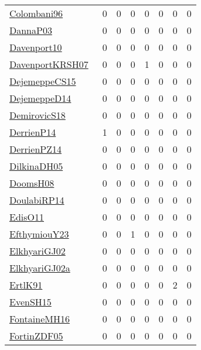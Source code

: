 {\begin{longtable}{l*{7}{r}}
\href{papers/Colombani96.pdf}{Colombani96}~\cite{Colombani96} & 0 & 0 & 0 & 0 & 0 & 0 & 0\\
\href{papers/DannaP03.pdf}{DannaP03}~\cite{DannaP03} & 0 & 0 & 0 & 0 & 0 & 0 & 0\\
\href{papers/Davenport10.pdf}{Davenport10}~\cite{Davenport10} & 0 & 0 & 0 & 0 & 0 & 0 & 0\\
\href{papers/DavenportKRSH07.pdf}{DavenportKRSH07}~\cite{DavenportKRSH07} & 0 & 0 & 0 & 1 & 0 & 0 & 0\\
\href{papers/DejemeppeCS15.pdf}{DejemeppeCS15}~\cite{DejemeppeCS15} & 0 & 0 & 0 & 0 & 0 & 0 & 0\\
\href{papers/DejemeppeD14.pdf}{DejemeppeD14}~\cite{DejemeppeD14} & 0 & 0 & 0 & 0 & 0 & 0 & 0\\
\href{papers/DemirovicS18.pdf}{DemirovicS18}~\cite{DemirovicS18} & 0 & 0 & 0 & 0 & 0 & 0 & 0\\
\href{papers/DerrienP14.pdf}{DerrienP14}~\cite{DerrienP14} & 1 & 0 & 0 & 0 & 0 & 0 & 0\\
\href{papers/DerrienPZ14.pdf}{DerrienPZ14}~\cite{DerrienPZ14} & 0 & 0 & 0 & 0 & 0 & 0 & 0\\
\href{papers/DilkinaDH05.pdf}{DilkinaDH05}~\cite{DilkinaDH05} & 0 & 0 & 0 & 0 & 0 & 0 & 0\\
\href{papers/DoomsH08.pdf}{DoomsH08}~\cite{DoomsH08} & 0 & 0 & 0 & 0 & 0 & 0 & 0\\
\href{papers/DoulabiRP14.pdf}{DoulabiRP14}~\cite{DoulabiRP14} & 0 & 0 & 0 & 0 & 0 & 0 & 0\\
\href{papers/EdisO11.pdf}{EdisO11}~\cite{EdisO11} & 0 & 0 & 0 & 0 & 0 & 0 & 0\\
\href{papers/EfthymiouY23.pdf}{EfthymiouY23}~\cite{EfthymiouY23} & 0 & 0 & 1 & 0 & 0 & 0 & 0\\
\href{papers/ElkhyariGJ02.pdf}{ElkhyariGJ02}~\cite{ElkhyariGJ02} & 0 & 0 & 0 & 0 & 0 & 0 & 0\\
\href{papers/ElkhyariGJ02a.pdf}{ElkhyariGJ02a}~\cite{ElkhyariGJ02a} & 0 & 0 & 0 & 0 & 0 & 0 & 0\\
\href{papers/ErtlK91.pdf}{ErtlK91}~\cite{ErtlK91} & 0 & 0 & 0 & 0 & 0 & 2 & 0\\
\href{papers/EvenSH15.pdf}{EvenSH15}~\cite{EvenSH15} & 0 & 0 & 0 & 0 & 0 & 0 & 0\\
\href{papers/FontaineMH16.pdf}{FontaineMH16}~\cite{FontaineMH16} & 0 & 0 & 0 & 0 & 0 & 0 & 0\\
\href{papers/FortinZDF05.pdf}{FortinZDF05}~\cite{FortinZDF05} & 0 & 0 & 0 & 0 & 0 & 0 & 0\\

\end{longtable}}
